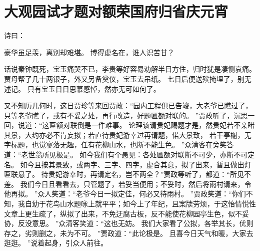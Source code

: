 \chapter{大观园试才题对额\quad 荣国府归省庆元宵}
\par
诗曰：\par
豪华虽足羡，离别却难堪。
博得虚名在，谁人识苦甘？\par
\hop
话说秦钟既死，宝玉痛哭不已，李贵等好容易劝解半日方住，归时犹是凄恻哀痛。
贾母帮了几十两银子，外又另备奠仪，宝玉去吊纸。
七日后便送殡掩埋了，别无述记。
只有宝玉日日思慕感悼，然亦无可如何了。
\par
又不知历几何时，这日贾珍等来回贾政：“园内工程俱已告竣，大老爷已瞧过了，只等老爷瞧了，或有不妥之处，再行改造，好题匾额对联的。
”贾政听了，沉思一回，说道：“这匾额对联倒是一件难事。
论理该请贵妃赐题才是，然贵妃若不亲睹其景，大约亦必不肯妄拟；若直待贵妃游幸过再请题，偌大景致，
若干亭榭，无字标题，也觉寥落无趣，任有花柳山水，也断不能生色。
”众清客在旁笑答道：“老世翁所见极是。
如今我们有个愚见：各处匾额对联断不可少，亦断不可定名。
如今且按其景致，或两字、三字、四字，虚合其意，拟了出来，暂且做出灯匾联悬了。
待贵妃游幸时，再请定名，岂不两全？”贾政等听了，都道：“所见不差。
我们今日且看看去，只管题了，若妥当便用；不妥时，然后将雨村请来，令他再拟。
”众人笑道：“老爷今日一拟定佳，何必又待雨村。
”贾政笑道：“你们不知，我自幼于花鸟山水题咏上就平平；如今上了年纪，且案牍劳烦，于这怡情悦性文章上更生疏了，纵拟了出来，不免迂腐古板，反不能使花柳园亭生色，似不妥协，反没意思。
”众清客笑道：“这也无妨。
我们大家看了公拟，各举其长，优则存之，劣则删之，未为不可。
”贾政道：“此论极是。
且喜今日天气和暖，大家去逛逛。
”说着起身，引众人前往。
\par
